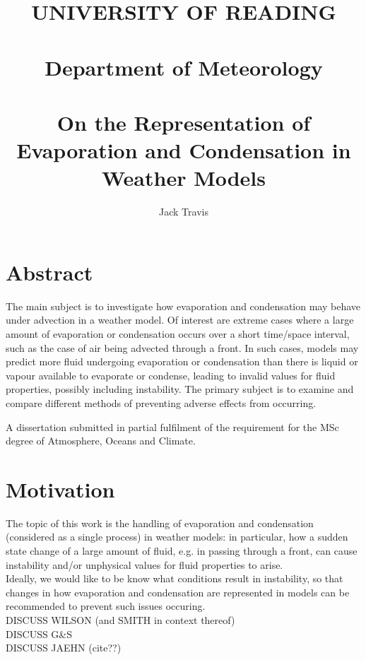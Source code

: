 \documentclass[11pt]{article}
\begin{document}
\thispagestyle{empty}
\title{UNIVERSITY OF READING\\
~\\
Department of Meteorology\\
~\\
On the Representation of Evaporation and Condensation in Weather Models}
\author{Jack Travis}
\maketitle

\section{Abstract}
The main subject is to investigate how evaporation and condensation may behave under advection in a weather model. Of interest are extreme cases where a large amount of evaporation or condensation occurs over a short time/space interval, such as the case of air being advected through a front. In such cases, models may predict more fluid undergoing evaporation or condensation than there is liquid or vapour available to evaporate or condense, leading to invalid values for fluid properties, possibly including instability. The primary subject is to examine and compare different methods of preventing adverse effects from occurring.

\null \vfill
A dissertation submitted in partial fulfilment of the requirement for the MSc degree of Atmosphere, Oceans and Climate.

\newpage
\tableofcontents

\newpage

\section{Motivation}
The topic of this work is the handling of evaporation and condensation (considered as a single process) in weather models: in particular, how a sudden state change of a large amount of fluid, e.g. in passing through a front, can cause instability and/or unphysical values for fluid properties to arise. \\
Ideally, we would like to be know what conditions result in instability, so that changes in how evaporation and condensation are represented in models can be recommended to prevent such issues occuring. \\
DISCUSS WILSON (and SMITH in context thereof) \\
DISCUSS G\&S \\
DISCUSS JAEHN (cite??) \\
\end{document}
